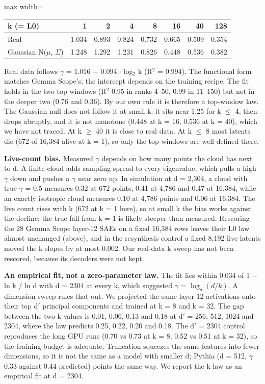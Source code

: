 \documentclass[11pt]{article}
\begin{document}
\begin{center}
\begin{adjustbox}{max width=\textwidth}
\small
\begin{tabular}{lrrrrrrr}
\toprule
\textbf{k (= L0)} & \textbf{1} & \textbf{2} & \textbf{4} & \textbf{8} & \textbf{16} & \textbf{40} & \textbf{128} \\
\midrule
Real & 1.034 & 0.893 & 0.824 & 0.732 & 0.665 & 0.509 & 0.354 \\
Gaussian N($\mu$, $\Sigma$) & 1.248 & 1.292 & 1.231 & 0.826 & 0.448 & 0.536 & 0.382 \\
\bottomrule
\end{tabular}
\end{adjustbox}
\end{center}

Real data follows $\gamma$ = 1.016 $-$ 0.094 $\cdot$ log$_2$ k (R$^2$ = 0.994). The functional form matches Gemma Scope's; the intercept depends on the training recipe. The fit holds in the two top windows (R$^2$ 0.95 in ranks 4--50, 0.99 in 11--150) but not in the deeper two (0.76 and 0.36). By our own rule it is therefore a top-window law. The Gaussian null does not follow it at small k: it sits near 1.25 for k $\le$ 4, then drops abruptly, and it is not monotone (0.448 at k = 16, 0.536 at k = 40), which we have not traced. At k $\ge$ 40 it is close to real data. At k $\le$ 8 most latents die (672 of 16,384 alive at k = 1), so only the top windows are well defined there.

\textbf{Live-count bias.} Measured $\gamma$ depends on how many points the cloud has next to d. A finite cloud adds sampling spread to every eigenvalue, which pulls a high $\gamma$ down and pushes a $\gamma$ near zero up. In simulation at d = 2,304, a cloud with true $\gamma$ = 0.5 measures 0.32 at 672 points, 0.41 at 4,786 and 0.47 at 16,384, while an exactly isotropic cloud measures 0.10 at 4,786 points and 0.06 at 16,384. The live count rises with k (672 at k = 1 here), so at small k the bias works against the decline: the true fall from k = 1 is likely steeper than measured. Rescoring the 28 Gemma Scope layer-12 SAEs on a fixed 16,384 rows leaves their L0 law almost unchanged (above), and in the resynthesis control a fixed 8,192 live latents moved the k-slopes by at most 0.002. Our real-data k sweep has not been rescored, because its decoders were not kept.

\textbf{An empirical fit, not a zero-parameter law.} The fit lies within 0.034 of 1 $-$ ln k / ln d with d = 2304 at every k, which suggested $\gamma$ = $\log_d(d/k)$. A dimension sweep rules that out. We projected the same layer-12 activations onto their top d$'$ principal components and trained at k = 8 and k = 32. The gap between the two k values is 0.01, 0.06, 0.13 and 0.18 at d$'$ = 256, 512, 1024 and 2304, where the law predicts 0.25, 0.22, 0.20 and 0.18. The d$'$ = 2304 control reproduces the long GPU runs (0.70 vs 0.73 at k = 8; 0.52 vs 0.51 at k = 32), so the training budget is adequate. Truncation squeezes the same features into fewer dimensions, so it is not the same as a model with smaller d; Pythia (d = 512, $\gamma$ 0.33 against 0.44 predicted) points the same way. We report the k-law as an empirical fit at d = 2304.
\end{document}
